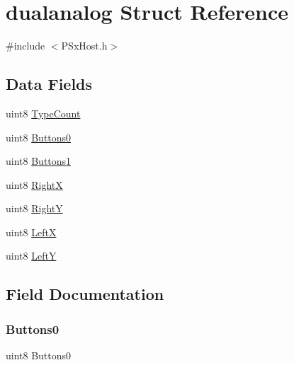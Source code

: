 \hypertarget{structdualanalog}{}\section{dualanalog Struct Reference}
\label{structdualanalog}


{\ttfamily \#include $<$P\+Sx\+Host.\+h$>$}

\subsection*{Data Fields}
\begin{DoxyCompactItemize}
\item 
uint8 \mbox{\hyperlink{structdualanalog_af8950e4872b4b4b5dd2b837ac45a0603}{Type\+Count}}
\item 
uint8 \mbox{\hyperlink{structdualanalog_a0d9f38dcaa6d84c7fc78d434b839f259}{Buttons0}}
\item 
uint8 \mbox{\hyperlink{structdualanalog_a17ebb8fd1844de7d6545c9f96194d300}{Buttons1}}
\item 
uint8 \mbox{\hyperlink{structdualanalog_a559c5161612b7e270912d743026202fd}{RightX}}
\item 
uint8 \mbox{\hyperlink{structdualanalog_a181876a6a15edd540d9d18e929ed0c1f}{RightY}}
\item 
uint8 \mbox{\hyperlink{structdualanalog_a68338607896f53b8c5abc93651ad88e9}{LeftX}}
\item 
uint8 \mbox{\hyperlink{structdualanalog_a5ca737141afa00b178178e73c6f50770}{LeftY}}
\end{DoxyCompactItemize}


\subsection{Field Documentation}
\mbox{\label{structdualanalog_a0d9f38dcaa6d84c7fc78d434b839f259}} 
\subsubsection{\texorpdfstring{Buttons0}{Buttons0}}
{\footnotesize\ttfamily uint8 Buttons0}

\mbox{\label{structdualanalog_a17ebb8fd1844de7d6545c9f96194d300}} 
